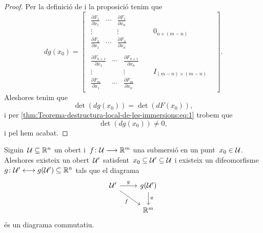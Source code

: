 \documentclass[../../main.tex]{subfiles}
\begin{document}
\begin{proof}
        Per la definició de  i la proposició  tenim que
        \[dg(x_{0})=\left[\begin{array}{c|ccc}
            \begin{matrix}
                \frac{\partial F_{1}}{\partial x_{1}} & \cdots & \frac{\partial F_{1}}{\partial x_{n}} \\
                \vdots & & \vdots \\
                \frac{\partial F_{n}}{\partial x_{1}} & \cdots & \frac{\partial F_{n}}{\partial x_{n}}
            \end{matrix} & & 0_{n\times(m-n)} & \\ \hline
            \begin{matrix}
                \frac{\partial F_{n+1}}{\partial x_{1}} & \cdots & \frac{\partial F_{n+1}}{\partial x_{n}} \\
                \vdots & & \vdots \\
                \frac{\partial F_{m}}{\partial x_{1}} & \cdots & \frac{\partial F_{m}}{\partial x_{n}}
            \end{matrix} & & I_{(m-n)\times(m-n)} &
        \end{array}\right].\]
        Aleshores tenim que
        \[
            \det(dg(x_{0}))=\det(dF(x_{0})),
        \]
        i per \eqref{thm:Teorema-destructura-local-de-les-immersions:eq:1} trobem que
        \[
            \det(dg(x_{0}))\neq0,
        \]
        i pel  hem acabat.
    \end{proof}
    \begin{theorem}
        \label{thm:Teorema-destructura-local-de-les-submersions}
        Siguin~\(\mathcal{U}\subseteq\mathbb{R}^{n}\) un obert i~\(f\colon\mathcal{U}\longrightarrow\mathbb{R}^{m}\) una submersió en un punt~\(x_{0}\in\mathcal{U}\).
        Aleshores existeix un obert~\(\mathcal{U}'\) satisfent~\(x_{0}\subseteq\mathcal{U}'\subseteq\mathcal{U}\) i existeix un difeomorfisme~\(g\colon\mathcal{U}'\longleftrightarrow g(\mathcal{U}')\subseteq\mathbb{R}^{n}\) tals que el diagrama
        \[\begin{tikzcd}
            \obert{U}' \arrow{r}{g} \arrow[swap]{dr}{f} & g(\obert{U}') \arrow{d}{\pi} \\
            & \mathbb{R}^{m}
        \end{tikzcd}\]
        és un diagrama commutatiu.
    \end{theorem}
\end{document}
